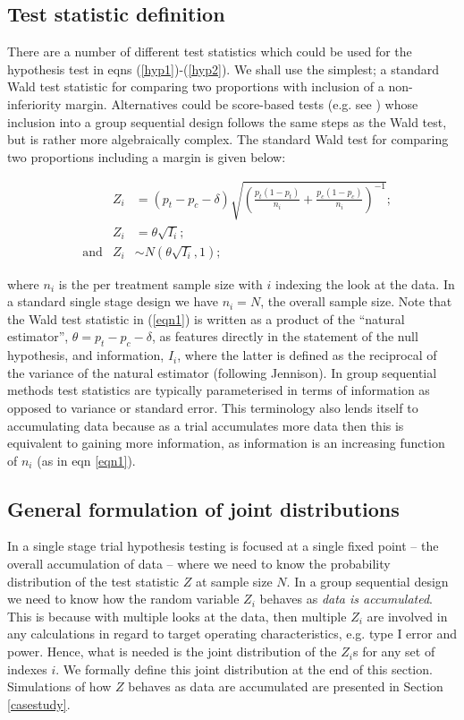 \documentclass{article}
\begin{document}
\subsection{Test statistic definition}
There are a number of different test statistics which could be used for the hypothesis test in eqns (\ref{hyp1})-(\ref{hyp2}). We shall use the simplest; a standard Wald test statistic for comparing two proportions with inclusion of a non-inferiority margin. Alternatives could be score-based tests (e.g. see \citep{Miettinen:1985aa,Newcombe:1998aa}) whose inclusion into a group sequential design follows the same steps as the Wald test, but is rather more algebraically complex. The standard Wald test for comparing two proportions including a margin is given below: 
\begin{fleqn}
\begin{align}
&&Z_{i}&=(p_t-p_c-\delta)\sqrt{\left(\frac{p_t(1-p_t)}{n_{i}}+\frac{p_c(1-p_c)}{n_{i}}\right)^{-1}};\label{eqn1}\\[2pt]
&&Z_{i}&=\theta \sqrt{I_{i}}; \label{eqn2}\\[5pt]
&\text{and}&Z_ {i} &\sim N(\theta \sqrt{I_{i}},1);
\end{align}
\end{fleqn}
where $n_{i}$ is the per treatment sample size with $i$ indexing the look at the data. In a standard single stage design we have $n_i=N$, the overall sample size. Note that the Wald test statistic in (\ref{eqn1}) is written as a product of the ``natural estimator'', $\theta=p_t-p_c-\delta$, as features directly in the statement of the null hypothesis, and information, $I_{i}$, where the latter is defined as the reciprocal of the variance of the natural estimator (following Jennison\citep{Jennison:2000aa}). In group sequential methods test statistics are typically parameterised in terms of information as opposed to variance or standard error. This terminology also lends itself to accumulating data because as a trial accumulates more data then this is equivalent to gaining more information, as information is an increasing function of $n_i$ (as in eqn \ref{eqn1}). 

\subsection{General formulation of joint distributions}
In a single stage trial hypothesis testing is focused at a single fixed point -- the overall accumulation of data -- where we need to know the probability distribution of the test statistic $Z$ at sample size $N$. In a group sequential design we need to know how the random variable $Z_i$ behaves as \emph{data is accumulated}. This is because with multiple looks at the data, then multiple $Z_i$ are involved in any calculations in regard to target operating characteristics, e.g. type I error and power. Hence, what is needed is the joint distribution of the $Z_i$s for any set of indexes $i$. We formally define this joint distribution at the end of this section. Simulations of how $Z$ behaves as data are accumulated are presented in Section \ref{casestudy}.     
\end{document}

